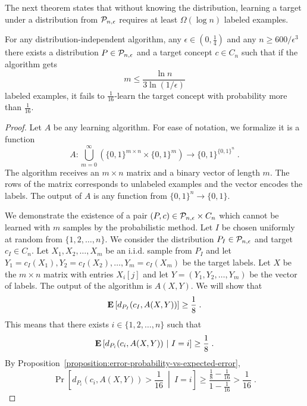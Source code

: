 The next theorem states that without knowing the distribution,
learning a target under a distribution from $\P_{n,\epsilon}$
requires at least $\Omega(\log n)$ labeled examples.

\begin{theorem}
For any distribution-independent algorithm, any $\epsilon \in (0,\frac{1}{4})$ and any
$n \ge 600/\epsilon^3$ there exists a distribution $P \in \P_{n,\epsilon}$ and a target
concept $c \in C_n$ such that if the algorithm gets
$$
m \le \frac{\ln n}{3 \ln (1/\epsilon)}
$$
labeled examples, it fails to $\frac{1}{16}$-learn the target concept with probability
more than $\frac{1}{16}$.
\end{theorem}

\begin{proof}
Let $A$ be any learning algorithm. For ease of notation, we formalize it is a function
$$
A:\bigcup_{m=0}^\infty \left(\{0,1\}^{m \times n} \times \{0,1\}^m\right) \to \{0,1\}^{\{0,1\}^n} \; .
$$
The algorithm receives an $m \times n$ matrix and a binary vector of length $m$.
The rows of the matrix corresponds to unlabeled examples and the vector encodes
the labels. The output of $A$ is any function from $\{0,1\}^n \to \{0,1\}$.

We demonstrate the existence of a pair $(P,c) \in \P_{n,\epsilon} \times C_n$ which
cannot be learned with $m$ samples by the probabilistic method. Let $I$ be chosen
uniformly at random from $\{1,2,\dots,n\}$. We consider the distribution $P_I \in
\P_{n,\epsilon}$ and target $c_I \in C_n$. Let $X_1, X_2, \dots, X_m$ be an i.i.d.
sample from $P_I$ and let $Y_1 = c_I(X_1), Y_2 = c_I(X_2), \dots, Y_m =
c_I(X_m)$ be the target labels. Let $X$ be the $m \times n$ matrix with entries
$X_i[j]$ and let $Y = (Y_1, Y_2, \dots, Y_m)$ be the vector of labels. The
output of the algorithm is $A(X,Y)$. We will show that
\begin{equation}
\label{equation:projections-failure-probability}
\Exp \left[d_{P_I}(c_I, A(X,Y)) \right] \ge \frac{1}{8} \; .
\end{equation}
This means that there exists $i \in \{1,2,\dots,n\}$ such that
$$
\Exp \left[d_{P_i}(c_i, A(X,Y)) ~\middle|~ I = i \right] \ge \frac{1}{8} \; .
$$
By Proposition~\ref{proposition:error-probability-vs-expected-error},
$$
\Pr \left[ d_{P_i}(c_i, A(X,Y)) > \frac{1}{16} ~\middle|~ I = i \right] \ge \frac{\frac{1}{8} - \frac{1}{16}}{1 - \frac{1}{16}} > \frac{1}{16} \; .
$$


\end{proof}

